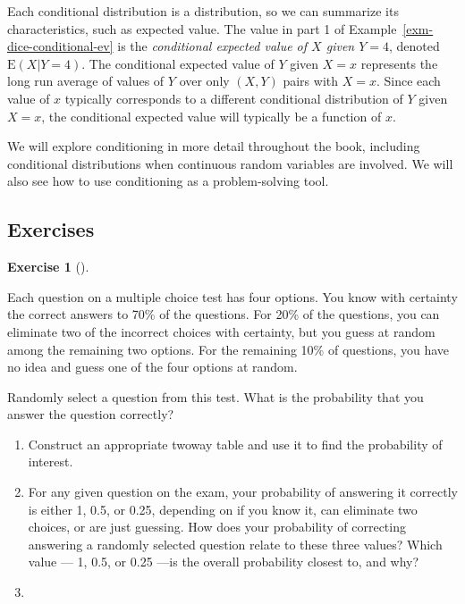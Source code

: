 \documentclass[
  letterpaper,
  DIV=11,
  numbers=noendperiod]{scrreprt}
\providecommand{\tightlist}{%
  \setlength{\itemsep}{0pt}\setlength{\parskip}{0pt}}
\theoremstyle{plain}
\theoremstyle{definition}
\theoremstyle{definition}
\newtheorem{exercise}{Exercise}[chapter]
\theoremstyle{definition}
\theoremstyle{remark}
\begin{document}
Each conditional distribution is a distribution, so we can summarize its
characteristics, such as expected value. The value in part 1 of
Example~\ref{exm-dice-conditional-ev} is the \emph{conditional expected
value of \(X\) given \(Y=4\)}, denoted \(\textrm{E}(X|Y=4)\). The
conditional expected value of \(Y\) given \(X=x\) represents the long
run average of values of \(Y\) over only \((X, Y)\) pairs with \(X=x\).
Since each value of \(x\) typically corresponds to a different
conditional distribution of \(Y\) given \(X=x\), the conditional
expected value will typically be a function of \(x\).

We will explore conditioning in more detail throughout the book,
including conditional distributions when continuous random variables are
involved. We will also see how to use conditioning as a problem-solving
tool.

\subsection{Exercises}\label{exercises-14}

\begin{exercise}[]\protect\hypertarget{exr-ltp-multiple-choice}{}\label{exr-ltp-multiple-choice}

Each question on a multiple choice test has four options. You know with
certainty the correct answers to 70\% of the questions. For 20\% of the
questions, you can eliminate two of the incorrect choices with
certainty, but you guess at random among the remaining two options. For
the remaining 10\% of questions, you have no idea and guess one of the
four options at random.

Randomly select a question from this test. What is the probability that
you answer the question correctly?

\begin{enumerate}
\def\labelenumi{\arabic{enumi}.}
\tightlist
\item
  Construct an appropriate twoway table and use it to find the
  probability of interest.
\item
  For any given question on the exam, your probability of answering it
  correctly is either 1, 0.5, or 0.25, depending on if you know it, can
  eliminate two choices, or are just guessing. How does your probability
  of correcting answering a randomly selected question relate to these
  three values? Which value --- 1, 0.5, or 0.25 ---is the overall
  probability closest to, and why?
\item
\end{enumerate}

\end{exercise}
\end{document}
